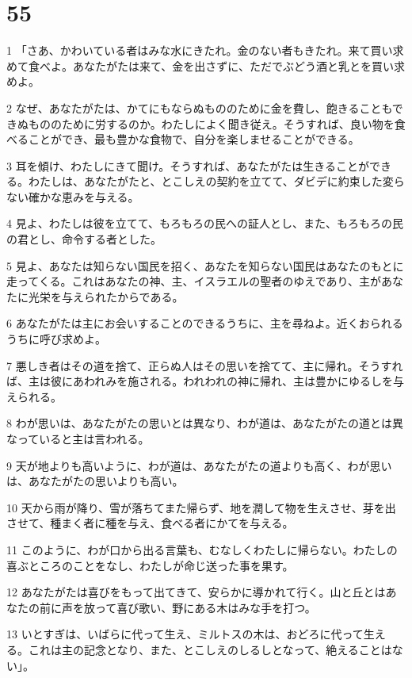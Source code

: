 \chapter{55}

\par 1 「さあ、かわいている者はみな水にきたれ。金のない者もきたれ。来て買い求めて食べよ。あなたがたは来て、金を出さずに、ただでぶどう酒と乳とを買い求めよ。
\par 2 なぜ、あなたがたは、かてにもならぬもののために金を費し、飽きることもできぬもののために労するのか。わたしによく聞き従え。そうすれば、良い物を食べることができ、最も豊かな食物で、自分を楽しませることができる。
\par 3 耳を傾け、わたしにきて聞け。そうすれば、あなたがたは生きることができる。わたしは、あなたがたと、とこしえの契約を立てて、ダビデに約束した変らない確かな恵みを与える。
\par 4 見よ、わたしは彼を立てて、もろもろの民への証人とし、また、もろもろの民の君とし、命令する者とした。
\par 5 見よ、あなたは知らない国民を招く、あなたを知らない国民はあなたのもとに走ってくる。これはあなたの神、主、イスラエルの聖者のゆえであり、主があなたに光栄を与えられたからである。
\par 6 あなたがたは主にお会いすることのできるうちに、主を尋ねよ。近くおられるうちに呼び求めよ。
\par 7 悪しき者はその道を捨て、正らぬ人はその思いを捨てて、主に帰れ。そうすれば、主は彼にあわれみを施される。われわれの神に帰れ、主は豊かにゆるしを与えられる。
\par 8 わが思いは、あなたがたの思いとは異なり、わが道は、あなたがたの道とは異なっていると主は言われる。
\par 9 天が地よりも高いように、わが道は、あなたがたの道よりも高く、わが思いは、あなたがたの思いよりも高い。
\par 10 天から雨が降り、雪が落ちてまた帰らず、地を潤して物を生えさせ、芽を出させて、種まく者に種を与え、食べる者にかてを与える。
\par 11 このように、わが口から出る言葉も、むなしくわたしに帰らない。わたしの喜ぶところのことをなし、わたしが命じ送った事を果す。
\par 12 あなたがたは喜びをもって出てきて、安らかに導かれて行く。山と丘とはあなたの前に声を放って喜び歌い、野にある木はみな手を打つ。
\par 13 いとすぎは、いばらに代って生え、ミルトスの木は、おどろに代って生える。これは主の記念となり、また、とこしえのしるしとなって、絶えることはない」。

